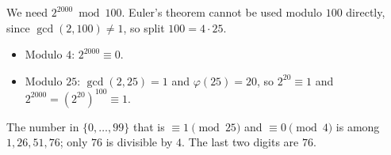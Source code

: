 We need $2^{2000}\bmod100$. Euler's theorem cannot be used modulo $100$ directly, since $\gcd(2,100)\ne1$, so split $100=4\cdot25$.
\begin{itemize}
\item Modulo $4$: $2^{2000}\equiv0$.
\item Modulo $25$: $\gcd(2,25)=1$ and $\varphi(25)=20$, so $2^{20}\equiv1$ and $2^{2000}=\left(2^{20}\right)^{100}\equiv1$.
\end{itemize}
The number in $\{0,\dots,99\}$ that is $\equiv1\pmod{25}$ and $\equiv0\pmod4$ is among $1,26,51,76$; only $76$ is divisible by $4$. The last two digits are $\boxed{76}$.
